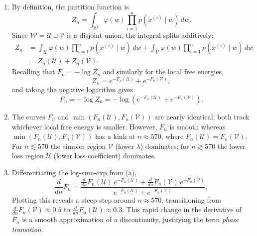 \documentclass[11pt]{article}
\newcommand{\W}{\mathcal{W}}
\newcommand{\U}{\mathcal{U}}
\newcommand{\V}{\mathcal{V}}
\begin{document}
\begin{solution}
\begin{enumerate}
    \item
        By definition, the partition function is
        \begin{equation*}
            Z_n = \int_\W \varphi(w) \prod_{i=1}^n p(x^{(i)} \mid w)\, dw.
        \end{equation*}
        Since $\W = \U \sqcup \V$ is a disjoint union, the integral splits additively:
        \begin{align*}
            Z_n &= \int_\U \varphi(w) \prod_{i=1}^n p(x^{(i)} \mid w)\, dw
                + \int_\V \varphi(w) \prod_{i=1}^n p(x^{(i)} \mid w)\, dw \\
                &= Z_n(\U) + Z_n(\V).
        \end{align*}
        Recalling that $F_n = -\log Z_n$ and similarly for the local free energies,
        \begin{equation*}
            Z_n = e^{-F_n(\U)} + e^{-F_n(\V)},
        \end{equation*}
        and taking the negative logarithm gives
        \begin{equation*}
            F_n = -\log Z_n = -\log(e^{-F_n(\U)} + e^{-F_n(\V)}).
        \end{equation*}

    \item
        The curves $F_n$ and $\min(F_n(\U), F_n(\V))$ are nearly
        identical, both track whichever local free energy is smaller.
        However, $F_n$ is smooth whereas $\min(F_n(\U), F_n(\V))$ has a
        kink at $n \approx 570$, where $F_n(\U) = F_n(\V)$.
        For $n \lesssim 570$ the simpler region $\V$ (lower $\lambda$)
        dominates; for $n \gtrsim 570$ the lower loss region $\U$
        (lower loss coefficient) dominates.

    \item
        Differentiating the log-sum-exp from (a),
        \begin{equation*}
            \frac{d}{dn}F_n
            = \frac{\frac{d}{dn}F_n(\U)\,e^{-F_n(\U)} + \frac{d}{dn}F_n(\V)\,e^{-F_n(\V)}}
                   {e^{-F_n(\U)} + e^{-F_n(\V)}},
        \end{equation*}
        Plotting this reveals a steep step around
        $n \approx 570$, transitioning from $\frac{d}{dn}F_n(\V) \approx 0.5$ to
        $\frac{d}{dn}F_n(\U) \approx 0.3$. This rapid change in the derivative of
        $F_n$ is a smooth approximation of a discontinuity, justifying
        the term \emph{phase transition}.


\end{enumerate}
\end{solution}
\end{document}
